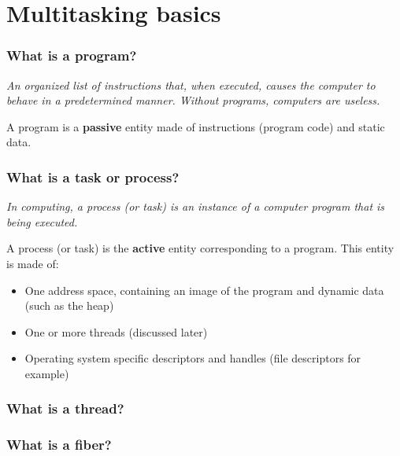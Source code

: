 %
%

\section{Multitasking basics}


\begin{frame}
  \frametitle{What is a program?}

  \emph{An organized list of instructions that, when executed, causes
  the computer to behave in a predetermined manner. Without programs,
  computers are useless.}

  \-

  A program is a \textbf{passive} entity made of instructions (program
  code) and static data.

\end{frame}


\begin{frame}
  \frametitle{What is a task or process?}

  \emph{In computing, a process (or task) is an instance of a computer
  program that is being executed.}

  \-

  A process (or task) is the \textbf{active} entity corresponding to a
  program. This entity is made of:

  \begin{itemize}
  \item
    One address space, containing an image of the program and dynamic
    data (such as the heap)
  \item
    One or more threads (discussed later)
  \item
    Operating system specific descriptors and handles (file
    descriptors for example)
  \end{itemize}

\end{frame}


\begin{frame}
  \frametitle{What is a thread?}

\end{frame}


\begin{frame}
  \frametitle{What is a fiber?}

\end{frame}


